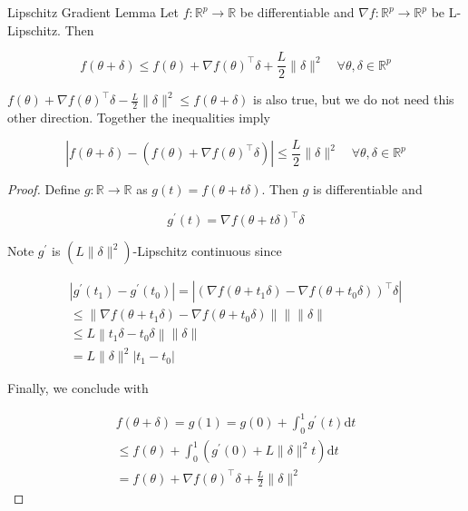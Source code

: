 \begin{frame}[allowframebreaks]

\begin{mytheoremblock}{2.4}{Lipschitz Gradient Lemma}
    Let $f: \mathbb{R}^{p} \rightarrow \mathbb{R}$ be differentiable and $\nabla f: \mathbb{R}^{p} \rightarrow \mathbb{R}^{p}$ be L-Lipschitz. Then

    $$
    f(\theta+\delta) \leq f(\theta)+\nabla f(\theta)^{\top} \delta+\frac{L}{2}\|\delta\|^{2} \quad \forall \theta, \delta \in \mathbb{R}^{p}
    $$

    \par\noindent\textcolor{gray}{\hdashrule{\textwidth}{0.4pt}{1pt 2pt}}

    $f(\theta)+\nabla f(\theta)^{\top} \delta-\frac{L}{2}\|\delta\|^{2} \leq f(\theta+\delta)$ is also true, but we do not need this other direction. Together the inequalities imply

    $$
    \left|f(\theta+\delta)-\left(f(\theta)+\nabla f(\theta)^{\top} \delta\right)\right| \leq \frac{L}{2}\|\delta\|^{2} \quad \forall \theta, \delta \in \mathbb{R}^{p}
    $$

    \begin{proof}
        Define $g: \mathbb{R} \rightarrow \mathbb{R}$ as $g(t)=f(\theta+t \delta)$. Then $g$ is differentiable and

        $$
        g^{\prime}(t)=\nabla f(\theta+t \delta)^{\top} \delta
        $$

        Note $g^{\prime}$ is $\left(L\|\delta\|^{2}\right)$-Lipschitz continuous since

        $$
        \begin{gathered}
        \left|g^{\prime}\left(t_{1}\right)-g^{\prime}\left(t_{0}\right)\right|=\left|\left(\nabla f\left(\theta+t_{1} \delta\right)-\nabla f\left(\theta+t_{0} \delta\right)\right)^{\top} \delta\right| \\
        \leq\left\|\nabla f\left(\theta+t_{1} \delta\right)-\nabla f\left(\theta+t_{0} \delta\right)\right\|\| \| \delta \| \\
        \leq L\left\|t_{1} \delta-t_{0} \delta\right\|\|\delta\| \\
        =L\|\delta\|^{2}\left|t_{1}-t_{0}\right|
        \end{gathered}
        $$

        Finally, we conclude with

        $$
        \begin{gathered}
        f(\theta+\delta)=g(1)=g(0)+\int_{0}^{1} g^{\prime}(t) \mathrm{d} t \\
        \leq f(\theta)+\int_{0}^{1}\left(g^{\prime}(0)+L\|\delta\|^{2} t\right) \mathrm{d} t \\
        =f(\theta)+\nabla f(\theta)^{\top} \delta+\frac{L}{2}\|\delta\|^{2}
        \end{gathered}
        $$
    \end{proof}
\end{mytheoremblock}

\end{frame}

